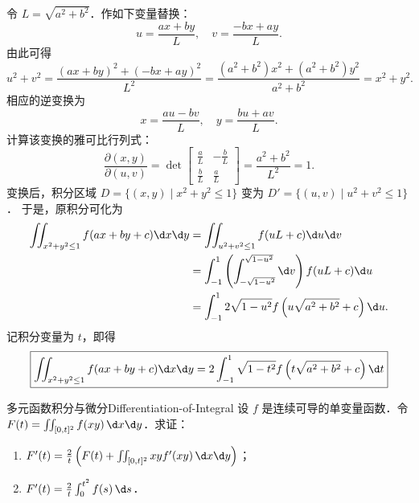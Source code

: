 \begin{myproof}
    令 $L = \sqrt{a^2+b^2}$．作如下变量替换：
    \begin{equation}\label{eq:substitution}
        u = \frac{ax+by}{L},\quad v = \frac{-bx+ay}{L}.
    \end{equation}
    由此可得
    \begin{equation}\label{eq:uv-properties}
        u^2 + v^2 = \frac{(ax+by)^2 + (-bx+ay)^2}{L^2} = \frac{(a^2+b^2)x^2 + (a^2+b^2)y^2}{a^2+b^2} = x^2+y^2.
    \end{equation}
    相应的逆变换为
    \begin{equation}\label{eq:inverse-sub}
        x = \frac{au-bv}{L},\quad y = \frac{bu+av}{L}.
    \end{equation}
    计算该变换的雅可比行列式：
    \begin{equation}\label{eq:jacobian}
        \frac{\partial(x, y)}{\partial(u, v)} = \det \begin{bmatrix} \frac{a}{L} & -\frac{b}{L} \\ \frac{b}{L} & \frac{a}{L} \end{bmatrix} = \frac{a^2+b^2}{L^2} = 1.
    \end{equation}
    变换后，积分区域 $D = \{ (x,y) \mid x^2+y^2 \le 1 \}$ 变为 $D' = \{ (u,v) \mid u^2+v^2 \le 1 \}$．
    于是，原积分可化为
    \begin{equation}\label{eq:integration-process}
        \begin{aligned}
            \iint_{x^2+y^2 \le 1} f(ax+by+c) \d x \d y & = \iint_{u^2+v^2 \le 1} f(uL+c) \d u \d v                                          \\
                                                       & = \int_{-1}^1 \left( \int_{-\sqrt{1-u^2}}^{\sqrt{1-u^2}} \d v \right) f(uL+c) \d u \\
                                                       & = \int_{-1}^1 2 \sqrt{1-u^2} f \left( u \sqrt{a^2+b^2} + c \right) \d u.
        \end{aligned}
    \end{equation}
    记积分变量为 $t$，即得
    \begin{equation}
        \boxed{\iint_{x^2+y^2 \le 1} f(ax+by+c) \d x \d y = 2 \int_{-1}^1 \sqrt{1-t^2} f \left( t \sqrt{a^2+b^2} + c \right) \d t}
    \end{equation}
\end{myproof}

\begin{problem}{多元函数积分与微分}{Differentiation-of-Integral}
    设 $f$ 是连续可导的单变量函数．令 $F(t) = \iint_{[0,t]^2} f(xy) \, \d x \d y$．求证：
    \begin{enumerate}
        \item $F'(t) = \frac{2}{t} \left( F(t) + \iint_{[0,t]^2} xy f'(xy) \, \d x \d y \right)$；
        \item $F'(t) = \frac{2}{t} \int_{0}^{t^2} f(s) \, \d s$．
    \end{enumerate}
\end{problem}

